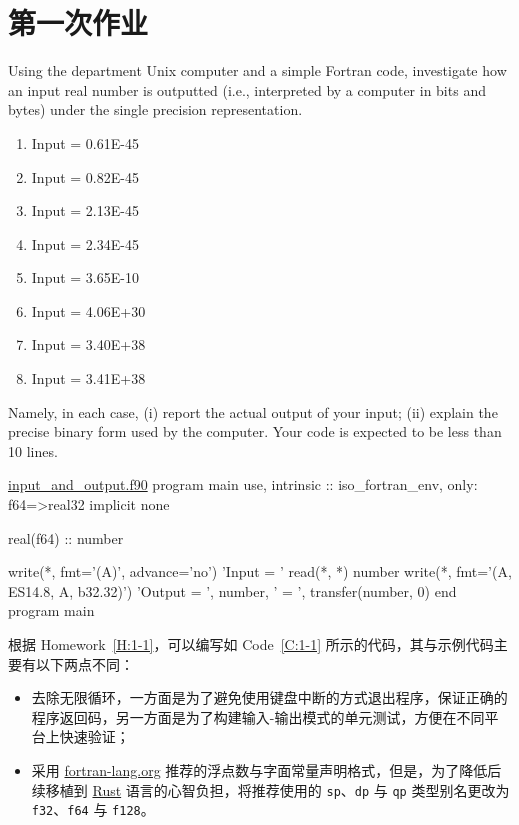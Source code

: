 \section{第一次作业}

\begin{homework}[label={H:1-1}]
    Using the department Unix computer and a simple Fortran code, investigate how an input real number is outputted (i.e., interpreted by a computer in bits and bytes) under the single precision representation.

    \begin{enumerate}[label=(\alph*)]
        \item Input = 0.61E-45
        \item Input = 0.82E-45
        \item Input = 2.13E-45
        \item Input = 2.34E-45
        \item Input = 3.65E-10
        \item Input = 4.06E+30
        \item Input = 3.40E+38
        \item Input = 3.41E+38
    \end{enumerate}

    Namely, in each case, (i) report the actual output of your input; (ii) explain the precise binary form used by the computer. Your code is expected to be less than 10 lines.
\end{homework}

\begin{fortran}[label={C:1-1}]{\href{https://github.com/iydon/CFDRust/blob/main/mae5005/homework/1/input_and_output.f90}{input\_and\_output.f90}}
program main
   use, intrinsic :: iso_fortran_env, only: f64=>real32
   implicit none

   real(f64) :: number

   write(*, fmt='(A)', advance='no') 'Input  = '
   read(*, *) number
   write(*, fmt='(A, ES14.8, A, b32.32)') 'Output = ', number, ' = ', transfer(number, 0)
end program main
\end{fortran}

根据 Homework~\ref{H:1-1}，可以编写如 Code~\ref{C:1-1} 所示的代码，其与示例代码主要有以下两点不同：

\begin{itemize}
    \item 去除无限循环，一方面是为了避免使用键盘中断的方式退出程序，保证正确的程序返回码，另一方面是为了构建输入-输出模式的单元测试，方便在不同平台上快速验证；
    \item 采用 \href{https://fortran-lang.org/learn/quickstart/variables}{fortran-lang.org} 推荐的浮点数与字面常量声明格式，但是，为了降低后续移植到 \href{https://www.rust-lang.org}{Rust} 语言的心智负担，将推荐使用的 \verb|sp|、\verb|dp| 与 \verb|qp| 类型别名更改为 \verb|f32|、\verb|f64| 与 \verb|f128|。
\end{itemize}

